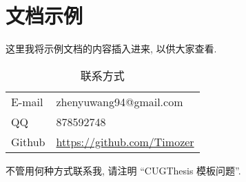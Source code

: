 \chapter{文档示例}
\label{chapter:egdoc}

这里我将示例文档的内容插入进来, 以供大家查看.

\begin{table}[htpb]
    \centering
    \caption{联系方式}
    \label{tab:contact}
    \begin{tabular}{>{\sffamily}l>{\ttfamily\small}l}
        \toprule
        E-mail & zhenyuwang94@gmail.com \\
        QQ & 878592748 \\
        Github & \url{https://github.com/Timozer} \\
        \bottomrule 
    \end{tabular}
\end{table}

不管用何种方式联系我, 请注明 ``CUGThesis 模板问题''.

\endinput